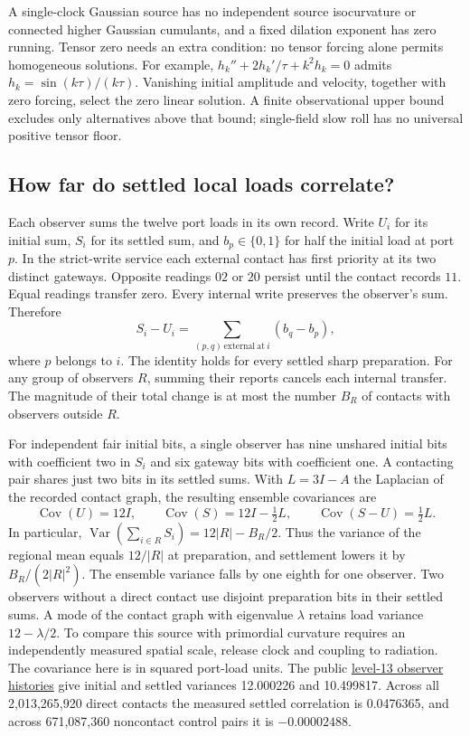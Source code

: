 \documentclass[11pt]{article}
\theoremstyle{remark}
\begin{document}
A single-clock Gaussian source has no independent source isocurvature or
connected higher Gaussian cumulants, and a fixed dilation exponent has
zero running. Tensor zero needs an extra condition: no tensor forcing alone
permits homogeneous solutions. For example,
\(h_k''+2h_k'/\tau+k^2h_k=0\) admits
\(h_k=\sin(k\tau)/(k\tau)\). Vanishing initial amplitude and velocity,
together with zero forcing, select the zero linear solution. A finite
observational upper bound excludes only alternatives above that bound;
single-field slow roll has no universal positive tensor floor.

\subsection{How far do settled local loads correlate?}
Each observer sums the twelve port loads in its own record. Write $U_i$ for
its initial sum, $S_i$ for its settled sum, and $b_p\in\{0,1\}$ for half
the initial load at port $p$. In the strict-write service each external
contact has first priority at its two distinct gateways. Opposite readings
$02$ or $20$ persist until the contact records $11$. Equal readings
transfer zero. Every internal write preserves the observer's sum. Therefore
\[
 S_i-U_i=\sum_{(p,q)\,\mathrm{external\ at}\ i}(b_q-b_p),
\]
where $p$ belongs to $i$. The identity holds for every settled sharp
preparation. For any group of observers $R$, summing their reports cancels
each internal transfer. The magnitude of their total change is at most the
number $B_R$ of contacts with observers outside $R$.

For independent fair initial bits, a single observer has nine unshared
initial bits with coefficient two in $S_i$ and six gateway bits with
coefficient one. A contacting pair shares just two bits in its settled sums.
With $L=3I-A$ the Laplacian of the recorded contact graph, the resulting
ensemble covariances are
\[
 \operatorname{Cov}(U)=12I,\qquad
 \operatorname{Cov}(S)=12I-\tfrac12 L,\qquad
 \operatorname{Cov}(S-U)=\tfrac12 L .
\]
In particular, $\operatorname{Var}(\sum_{i\in R}S_i)=12|R|-B_R/2$.
Thus the variance of the regional mean equals $12/|R|$ at
preparation, and settlement lowers it by $B_R/(2|R|^2)$. The ensemble
variance falls by one eighth for one observer. Two observers
without a direct contact use disjoint preparation bits in their settled
sums. A mode of the contact graph with eigenvalue $\lambda$ retains load
variance $12-\lambda/2$. To compare this source with primordial curvature
requires an independently measured spatial scale, release clock and
coupling to radiation. The covariance here is in squared port-load units.
The public \href{https://dovybzrnzxfo1.cloudfront.net/manifest.json}{level-13
observer histories} give initial and settled variances 12.000226 and
10.499817. Across all 2,013,265,920 direct contacts the measured settled
correlation is 0.0476365, and across 671,087,360 noncontact control pairs
it is $-0.00002488$.
\end{document}

